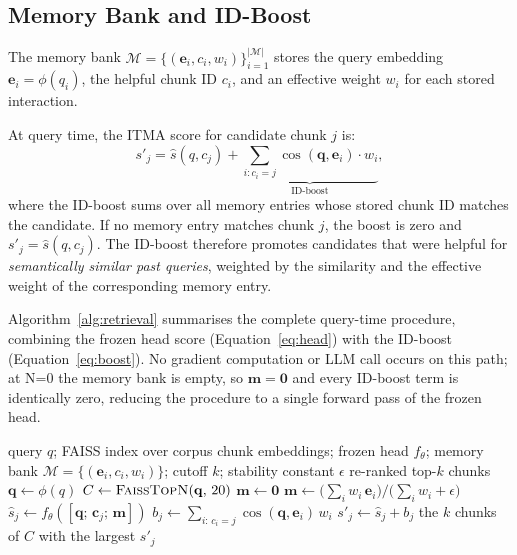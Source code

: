 \documentclass[preprint,12pt]{elsarticle}
\begin{document}
\subsection{Memory Bank and ID-Boost}
\label{sec:memory}
The memory bank $\mathcal{M} = \{(\mathbf{e}_i, c_i, w_i)\}_{i=1}^{|\mathcal{M}|}$
stores the query embedding $\mathbf{e}_i = \phi(q_i)$, the helpful chunk ID
$c_i$, and an effective weight $w_i$ for each stored interaction.

At query time, the ITMA score for candidate chunk $j$ is:
\begin{equation}
s'_j = \hat{s}(q, c_j)
  + \underbrace{\sum_{i\colon c_i = j}
    \cos(\mathbf{q}, \mathbf{e}_i) \cdot w_i}_{\text{ID-boost}},
\label{eq:boost}
\end{equation}
where the ID-boost sums over all memory entries whose stored chunk ID matches
the candidate.  If no memory entry matches chunk $j$, the boost is zero and
$s'_j = \hat{s}(q, c_j)$.  The ID-boost therefore promotes candidates that
were helpful for \emph{semantically similar past queries}, weighted by the
similarity and the effective weight of the corresponding memory entry.

Algorithm~\ref{alg:retrieval} summarises the complete query-time procedure,
combining the frozen head score (Equation~\ref{eq:head}) with the ID-boost
(Equation~\ref{eq:boost}).  No gradient computation or LLM call occurs on this
path; at N=0 the memory bank is empty, so $\mathbf{m}=\mathbf{0}$ and every
ID-boost term is identically zero, reducing the procedure to a single forward
pass of the frozen head.

\begin{algorithm}[htbp]
\caption{ITMA retrieval at query time.}
\label{alg:retrieval}
\begin{algorithmic}[1]
\REQUIRE query $q$; FAISS index over corpus chunk embeddings; frozen head
  $f_\theta$; memory bank $\mathcal{M}=\{(\mathbf{e}_i,c_i,w_i)\}$;
  cutoff $k$; stability constant $\epsilon$
\ENSURE re-ranked top-$k$ chunks
\STATE $\mathbf{q} \leftarrow \phi(q)$ 
\STATE $C \leftarrow \textsc{FaissTopN}(\mathbf{q},\,20)$ 
  \STATE $\mathbf{m} \leftarrow \mathbf{0}$ 
\ELSE
  \STATE $\mathbf{m} \leftarrow \big(\textstyle\sum_i w_i\,\mathbf{e}_i\big)\big/\big(\textstyle\sum_i w_i + \epsilon\big)$ 
\ENDIF
{}
  \STATE $\hat{s}_j \leftarrow f_\theta([\mathbf{q};\,\mathbf{c}_j;\,\mathbf{m}])$ 
  \STATE $b_j \leftarrow \sum_{i:\,c_i = j} \cos(\mathbf{q},\mathbf{e}_i)\,w_i$ 
  \STATE $s'_j \leftarrow \hat{s}_j + b_j$ 
\ENDFOR
\RETURN the $k$ chunks of $C$ with the largest $s'_j$
\end{algorithmic}
\end{algorithm}
\end{document}
